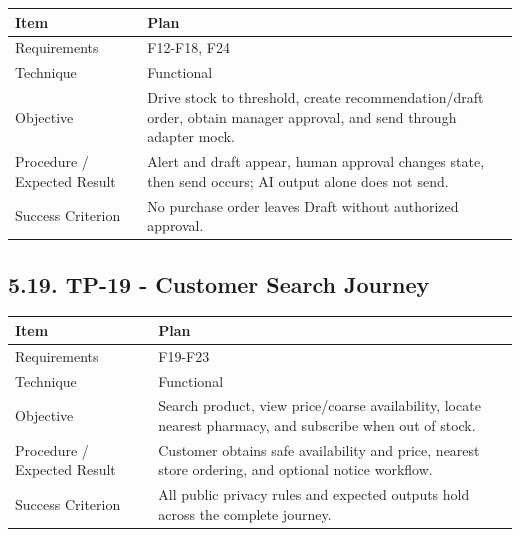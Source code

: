 {\def\LTcaptype{none} %
\begin{longtable}[]{|
  >{\raggedright\arraybackslash}m{}|
  >{\raggedright\arraybackslash}m{}|}
\hline
\begin{minipage}[c]{\linewidth}\raggedright
\textbf{Item}
\end{minipage} & \begin{minipage}[c]{\linewidth}\raggedright
\textbf{Plan}
\end{minipage} \\
\hline
\endhead

\endlastfoot
Requirements & F12-F18, F24 \\ \hline
Technique & Functional \\ \hline
Objective & Drive stock to threshold, create recommendation/draft order, obtain manager approval, and send through adapter mock. \\ \hline
Procedure / Expected Result & Alert and draft appear, human approval changes state, then send occurs; AI output alone does not send. \\ \hline
Success Criterion & No purchase order leaves Draft without authorized approval. \\ \hline
\end{longtable}
}

\subsection{5.19. TP-19 - Customer Search Journey}\label{tp-19---customer-search-journey}

{\def\LTcaptype{none} %
\begin{longtable}[]{|
  >{\raggedright\arraybackslash}m{}|
  >{\raggedright\arraybackslash}m{}|}
\hline
\begin{minipage}[c]{\linewidth}\raggedright
\textbf{Item}
\end{minipage} & \begin{minipage}[c]{\linewidth}\raggedright
\textbf{Plan}
\end{minipage} \\
\hline
\endhead

\endlastfoot
Requirements & F19-F23 \\ \hline
Technique & Functional \\ \hline
Objective & Search product, view price/coarse availability, locate nearest pharmacy, and subscribe when out of stock. \\ \hline
Procedure / Expected Result & Customer obtains safe availability and price, nearest store ordering, and optional notice workflow. \\ \hline
Success Criterion & All public privacy rules and expected outputs hold across the complete journey. \\ \hline
\end{longtable}
}

